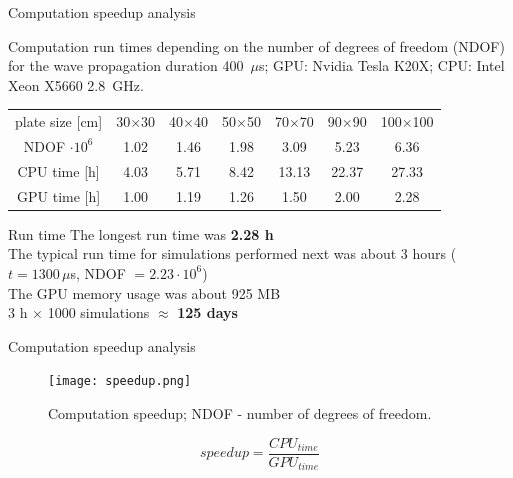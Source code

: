 \documentclass[10pt]{beamer} %
\begin{document}
\begin{frame}{Computation speedup analysis}
	\begin{table}
		\renewcommand{\arraystretch}{1.3}
		\centering \small
		Computation run times depending on the number of degrees of freedom (NDOF) for the wave propagation duration 400~$\mu$s; GPU: Nvidia Tesla K20X; CPU: Intel Xeon X5660 2.8~GHz.
		
		\begin{tabular}{ccccccc} 
			\toprule	
			plate size [cm] & 30$\times$30  & 40$\times$40 & 50$\times$50 & 70$\times$70 & 90$\times$90 & 100$\times$100 \\
			NDOF $\cdot 10^6$ & 1.02  & 1.46 & 1.98 & 3.09 & 5.23 & 6.36 \\
			\midrule
			CPU time [h]& 4.03& 5.71 & 8.42 & 13.13 & 22.37 & 27.33\\
			\midrule
			GPU time [h]& 1.00& 1.19 & 1.26 & 1.50 & 2.00 & 2.28\\
			\bottomrule 
		\end{tabular} 
		\label{tab:run_time}
	\end{table}
	\begin{alertblock}{Run time}
		The longest run time was \textbf{2.28 h}\\
		The typical run time for simulations performed next was about 3 hours ($t = 1300\, \mu$s, NDOF $= 2.23\cdot 10^6$) \\
		The GPU memory usage was about 925 MB\\
		3 h $\times$ 1000 simulations $\approx$ \textbf{125 days}
	\end{alertblock}
\end{frame}
\begin{frame}{Computation speedup analysis}
	\begin{figure} [h!]
		\centering
		\texttt{[image: speedup.png]}	
		\caption{Computation speedup; NDOF - number of degrees of freedom.}
		\label{fig:speedup}
	\end{figure}
	\begin{equation*}
	speedup = \frac{CPU_{time}}{GPU_{time}}
	\label{eq:speedup}
	\end{equation*}
\end{frame}
\end{document}
